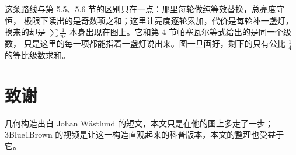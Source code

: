这条路线与第 5.5、5.6 节的区别只在一点：那里每轮做纯等效替换，总亮度守恒，
极限下读出的是奇数项之和；这里让亮度逐轮累加，代价是每轮补一盏灯，换来的却是
$\sum\frac{1}{n^{2}}$ 本身出现在图上。它和第 4 节帕塞瓦尔等式给出的是同一个级数，
只是这里的每一项都能指着一盏灯说出来。图一旦画好，剩下的只有公比 $\frac14$
的等比级数求和。

\section*{致谢}

几何构造出自 Johan Wästlund 的短文，本文只是在他的图上多走了一步；
3Blue1Brown 的视频是让这一构造直观起来的科普版本，本文的整理也受益于它。
